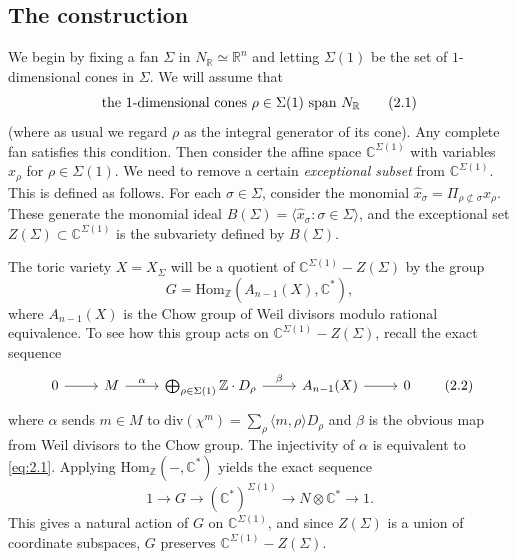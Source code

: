 \documentclass{amsart}
\theoremstyle{plain}
\theoremstyle{definition}
\begin{document}
	\subsection{The construction} We begin by fixing a fan
$\Sigma$ in $N_{\mathbb{R}} \simeq \mathbb{R}^n$ and letting $\Sigma(1)$
be the set of $1$-dimensional cones in $\Sigma$.  We will assume that
\begin{equation}
\hbox{the $1$-dimensional cones $\rho \in \Sigma(1)$ span $N_{\mathbb{R}}$}
\tag{2.1}\label{eq:2.1}
\end{equation}
(where as usual we regard $\rho$ as the integral generator of its
cone).  Any complete fan satisfies this condition.  Then consider the
affine space $\mathbb{C}^{\Sigma(1)}$ with variables $x_\rho$ for $\rho
\in \Sigma(1)$.  We need to remove a certain {\it exceptional
subset\/} from $\mathbb{C}^{\Sigma(1)}$.  This is defined as follows.
For each $\sigma \in \Sigma$, consider the monomial $\hat x_\sigma =
\Pi_{\rho \not\subset\sigma} x_\rho$.  These generate the monomial
ideal $B(\Sigma) = \langle \hat x_\sigma : \sigma \in
\Sigma\rangle$, and the exceptional set $Z(\Sigma) \subset \mathbb{C}^{\Sigma(1)}$ is the subvariety defined by $B(\Sigma)$.

	The toric variety $X = X_\Sigma$ will be a quotient of $\mathbb{C}^{\Sigma(1)} - Z(\Sigma)$ by the group 
\[
G = \mathrm{Hom}_{\mathbb{Z}}(A_{n-1}(X),\mathbb{C}^*),
\]
where $A_{n-1}(X)$ is the Chow group of Weil divisors modulo rational
equivalence.  To see how this group acts on $\mathbb{C}^{\Sigma(1)} -
Z(\Sigma)$, recall the exact sequence
\begin{equation}
\begin{tikzcd}
0 \arrow[r] & M \arrow[r, "\alpha"] & {\bigoplus_{\rho \in \Sigma(1)}\mathbb{Z}\cdot D_\rho} \arrow[r, "\beta"] & A_{n-1}(X) \arrow[r] & 0
\end{tikzcd}
\tag{2.2}\label{eq:2.2}
\end{equation}
where $\alpha$ sends $m \in M$ to $\mathrm{div}(\chi^m) = \sum_\rho
\langle m,\rho\rangle D_\rho$ and $\beta$ is the obvious map from Weil
divisors to the Chow group.  The injectivity of $\alpha$ is equivalent
to \eqref{eq:2.1}.  Applying $\mathrm{Hom}_{\mathbb{Z}}(-,\mathbb{C}^*)$
yields the exact sequence
\begin{equation}
1 \longrightarrow G \longrightarrow (\mathbb{C}^*)^{\Sigma(1)}
\longrightarrow N\otimes\mathbb{C}^* \longrightarrow 1.
\tag{2.3}\label{eq:2.3}
\end{equation}
This gives a natural action of $G$ on $\mathbb{C}^{\Sigma(1)}$, and
since $Z(\Sigma)$ is a union of coordinate subspaces, $G$ preserves
$\mathbb{C}^{\Sigma(1)} -Z(\Sigma)$.
\end{document}
